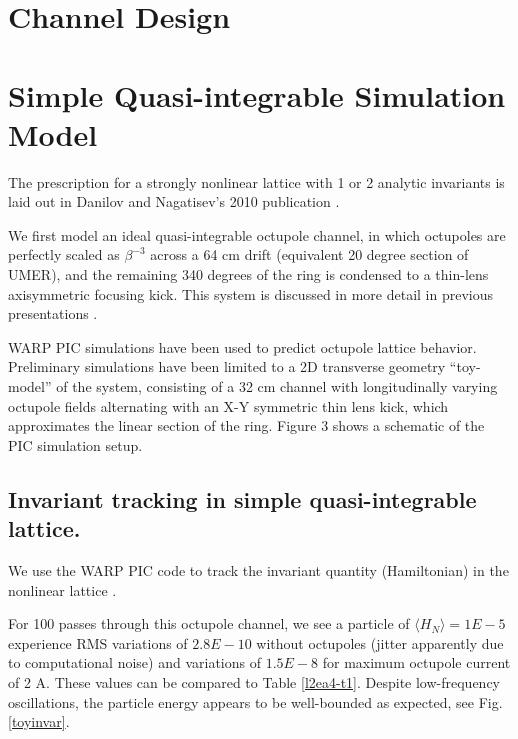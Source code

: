 \section{Channel Design}





\section{Simple Quasi-integrable Simulation Model}

The prescription for a strongly nonlinear lattice with 1 or 2 analytic invariants is laid out in Danilov and Nagatisev's 2010 publication \cite{Danilov2010}.

We first model an ideal quasi-integrable octupole channel, in which octupoles are perfectly scaled as $\beta^{-3}$ across a 64 cm drift (equivalent 20 degree section of UMER), and the remaining 340 degrees of the ring is condensed to a thin-lens axisymmetric focusing kick. This system is discussed in more detail in previous presentations \cite{KRAAC}.

WARP PIC simulations have been used to predict octupole lattice behavior. Preliminary simulations have been limited to a 2D transverse geometry “toy-model” of the system, consisting of a 32 cm channel with longitudinally varying octupole fields alternating with an X-Y symmetric thin lens kick, which approximates the linear section of the ring. Figure 3 shows a schematic of the PIC simulation setup.

\subsection{Invariant tracking in simple quasi-integrable lattice.}

We use the WARP PIC code to track the invariant quantity (Hamiltonian) in the nonlinear lattice \cite{warp}. 

For 100 passes through this octupole channel, we see a particle of $\langle H_N\rangle =1E-5$ experience RMS variations of $2.8E-10$ without octupoles (jitter apparently due to computational noise) and variations of $1.5E-8$ for maximum octupole current of 2 A. These values can be compared to Table \ref{l2ea4-t1}. Despite low-frequency oscillations, the particle energy appears to be well-bounded as expected, see Fig. \ref{toyinvar}.

